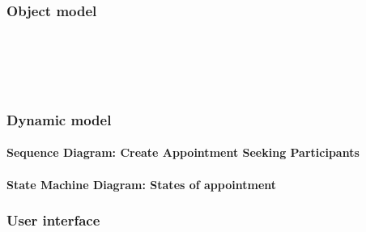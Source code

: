 \subsubsection{Object model}
		\\[1in]
	\begin{center}	
		\\[.2in]
		\\
	\end{center}
		

	\pagebreak

\subsubsection{Dynamic model}

	\paragraph{Sequence Diagram: Create Appointment Seeking Participants} 
	\pagebreak

	\paragraph{State Machine Diagram: States of appointment}
\subsubsection{User interface}

\
